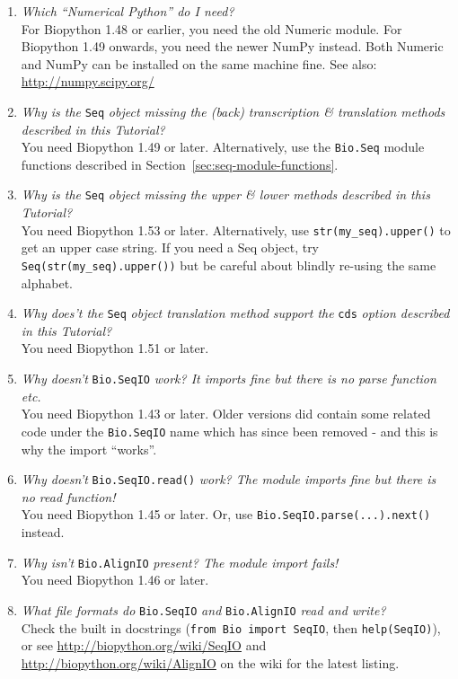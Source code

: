\documentclass{report}
\begin{document}
\begin{enumerate}
  \item \emph{Which ``Numerical Python'' do I need?} \\
  For Biopython 1.48 or earlier, you need the old Numeric module.
  For Biopython 1.49 onwards, you need the newer NumPy instead.
  Both Numeric and NumPy can be installed on the same machine fine.
  See also: \url{http://numpy.scipy.org/}

  \item \emph{Why is the} \verb|Seq| \emph{object missing the (back) transcription \& translation methods described in this Tutorial?} \\
  You need Biopython 1.49 or later.  Alternatively, use the \verb|Bio.Seq| module functions described in Section~\ref{sec:seq-module-functions}.

  \item \emph{Why is the} \verb|Seq| \emph{object missing the upper \& lower methods described in this Tutorial?} \\
  You need Biopython 1.53 or later.  Alternatively, use \verb|str(my_seq).upper()| to get an upper case string.
  If you need a Seq object, try \verb|Seq(str(my_seq).upper())| but be careful about blindly re-using the same alphabet.
 
  \item \emph{Why does't the} \verb|Seq| \emph{object translation method support the} \verb|cds| \emph{option described in this Tutorial?} \\
  You need Biopython 1.51 or later.

  \item \emph{Why doesn't} \verb|Bio.SeqIO| \emph{work? It imports fine but there is no parse function etc.} \\
  You need Biopython 1.43 or later.  Older versions did contain some related code under the \verb|Bio.SeqIO| name which has since been removed - and this is why the import ``works''.

  \item \emph{Why doesn't} \verb|Bio.SeqIO.read()| \emph{work? The module imports fine but there is no read function!} \\
  You need Biopython 1.45 or later.  Or, use \texttt{Bio.SeqIO.parse(...).next()} instead.

  \item \emph{Why isn't} \verb|Bio.AlignIO| \emph{present? The module import fails!} \\
  You need Biopython 1.46 or later.

  \item \emph{What file formats do} \verb|Bio.SeqIO| \emph{and} \verb|Bio.AlignIO| \emph{read and write?} \\
  Check the built in docstrings (\texttt{from Bio import SeqIO}, then \texttt{help(SeqIO)}), or see \url{http://biopython.org/wiki/SeqIO} and \url{http://biopython.org/wiki/AlignIO} on the wiki for the latest listing.
  

\end{enumerate}
\end{document}
